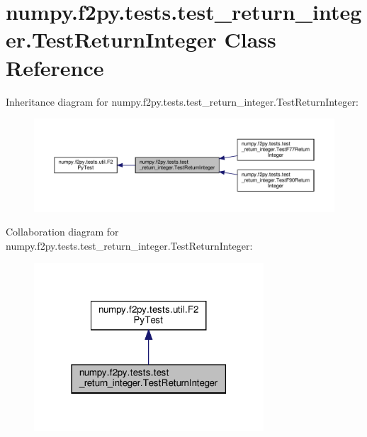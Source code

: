 \hypertarget{classnumpy_1_1f2py_1_1tests_1_1test__return__integer_1_1TestReturnInteger}{}\section{numpy.\+f2py.\+tests.\+test\+\_\+return\+\_\+integer.\+Test\+Return\+Integer Class Reference}
\label{classnumpy_1_1f2py_1_1tests_1_1test__return__integer_1_1TestReturnInteger}


Inheritance diagram for numpy.\+f2py.\+tests.\+test\+\_\+return\+\_\+integer.\+Test\+Return\+Integer\+:
\nopagebreak
\begin{figure}[H]
\begin{center}
\leavevmode
\includegraphics[width=350pt]{classnumpy_1_1f2py_1_1tests_1_1test__return__integer_1_1TestReturnInteger__inherit__graph}
\end{center}
\end{figure}


Collaboration diagram for numpy.\+f2py.\+tests.\+test\+\_\+return\+\_\+integer.\+Test\+Return\+Integer\+:
\nopagebreak
\begin{figure}[H]
\begin{center}
\leavevmode
\includegraphics[width=243pt]{classnumpy_1_1f2py_1_1tests_1_1test__return__integer_1_1TestReturnInteger__coll__graph}
\end{center}
\end{figure}
